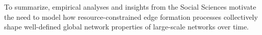 %
%
%
%


To summarize, empirical analyses and insights from the Social Sciences motivate
the need to model how resource-constrained edge formation processes collectively
shape well-defined global network properties of large-scale networks over time.




